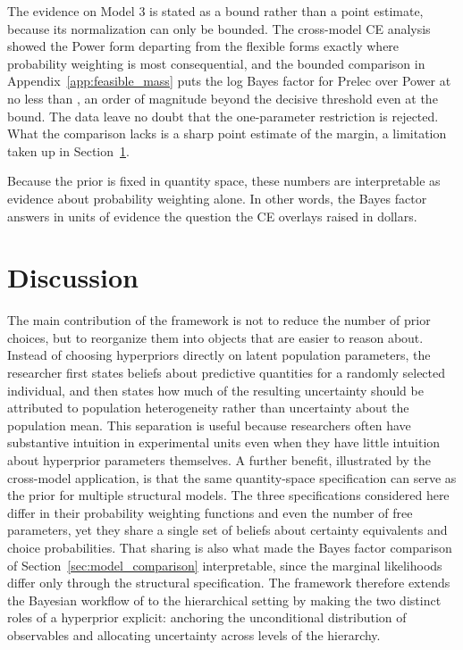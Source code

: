 \documentclass[12pt,a4paper]{article}
\theoremstyle{definition}
\theoremstyle{remark}
\begin{document}
The evidence on Model 3 is stated as a bound rather than a point
estimate, because its normalization can only be bounded. The
cross-model CE analysis showed the Power form departing from the
flexible forms exactly where probability weighting is most
consequential, and the bounded comparison in
Appendix~\ref{app:feasible_mass} puts the log Bayes factor for Prelec
over Power at no less than , an
order of magnitude beyond the decisive threshold even at the bound. The
data leave no doubt that the one-parameter restriction is rejected.
What the comparison lacks is a sharp point estimate of the margin, a
limitation taken up in Section~\ref{sec:discussion}.

Because the prior is fixed in quantity space, these numbers are
interpretable as evidence about probability weighting alone. In other
words, the Bayes factor answers in units of evidence the question the CE
overlays raised in dollars.

\section{Discussion}
\label{sec:discussion}

The main contribution of the framework is not to reduce the number of prior
choices, but to reorganize them into objects that are easier to reason about.
Instead of choosing hyperpriors directly on latent population parameters, the
researcher first states beliefs about predictive quantities for a randomly
selected individual, and then states how much of the resulting uncertainty
should be attributed to population heterogeneity rather than uncertainty about
the population mean. This separation is useful because researchers often have
substantive intuition in experimental units even when they have little
intuition about hyperprior parameters themselves. A further benefit, illustrated
by the cross-model application, is that the same quantity-space specification
can serve as the prior for multiple structural models. The three specifications
considered here differ in their probability weighting
functions and even the number of free parameters, yet they share a single set
of beliefs about certainty equivalents and choice probabilities. That sharing
is also what made the Bayes factor comparison of
Section~\ref{sec:model_comparison} interpretable, since the marginal
likelihoods differ only through the structural specification.
The framework therefore extends the Bayesian workflow of \textcite{Gabry2019}
to the hierarchical setting by making the two distinct roles of a hyperprior
explicit: anchoring the unconditional distribution of observables and allocating
uncertainty across levels of the hierarchy.
\end{document}
